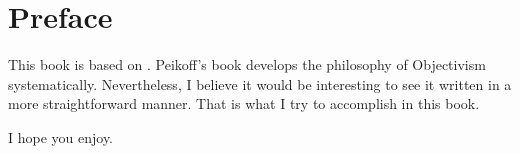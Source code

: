 \chapter*{Preface}

    This book is based on \cite{peikoff1993}. Peikoff's book develops the philosophy of Objectivism systematically. Nevertheless, I believe it would be interesting to see it written in a more straightforward manner. That is what I try to accomplish in this book.
    
    

    I hope you enjoy.